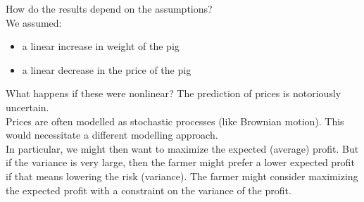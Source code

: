 \documentclass{workbook}
\begin{document}
\begin{slide}

\begin{definition}[Robustness]
How do the results depend on the assumptions?\\

We assumed:
\begin{itemize}
	\item a linear increase in weight of the pig
	\item a linear decrease in the price of the pig	  \\
\end{itemize}

What happens if these were nonlinear? The prediction of prices is notoriously uncertain. \\

Prices are often modelled as stochastic processes (like Brownian motion). This would necessitate a different modelling approach.  \\

In particular, we might then want to maximize the expected (average) profit. But if the variance is very large, then the farmer might prefer a lower expected profit if that means lowering the risk (variance). 
The farmer might consider maximizing the expected profit with a constraint on the variance of the profit.
\end{definition}

\end{slide}
\end{document}
